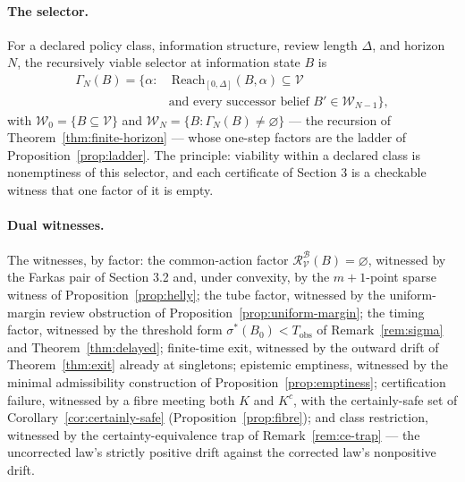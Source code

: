 \documentclass[10pt,twocolumn]{article}
\theoremstyle{definition}
\begin{document}
\paragraph{The selector.} For a declared policy class, information structure, review length \(\Delta\), and horizon \(N\), the recursively viable selector at information state \(B\) is
\[
\begin{split}
\Gamma_{N}(B) = \bigl\{\alpha :&\ \mathrm{Reach}_{[0,\Delta]}(B,\alpha) \subseteq \mathcal{V} \\
&\text{and every successor belief } B' \in \mathcal{W}_{N-1}\bigr\},
\end{split}
\]
with \(\mathcal{W}_{0} = \{B \subseteq \mathcal{V}\}\) and \(\mathcal{W}_{N} = \{B : \Gamma_{N}(B) \neq \varnothing\}\) --- the recursion of Theorem~\ref{thm:finite-horizon} --- whose one-step factors are the ladder of Proposition~\ref{prop:ladder}. The principle: viability within a declared class is nonemptiness of this selector, and each certificate of Section 3 is a checkable witness that one factor of it is empty.

\paragraph{Dual witnesses.} The witnesses, by factor: the common-action factor \(\mathcal{R}^{\mathcal{B}}_{\mathcal{V}}(B) = \varnothing\), witnessed by the Farkas pair of Section 3.2 and, under convexity, by the \(m+1\)-point sparse witness of Proposition~\ref{prop:helly}; the tube factor, witnessed by the uniform-margin review obstruction of Proposition~\ref{prop:uniform-margin}; the timing factor, witnessed by the threshold form \(\sigma^{*}(B_{0}) < T_{\mathrm{obs}}\) of Remark~\ref{rem:sigma} and Theorem~\ref{thm:delayed}; finite-time exit, witnessed by the outward drift of Theorem~\ref{thm:exit} already at singletons; epistemic emptiness, witnessed by the minimal admissibility construction of Proposition~\ref{prop:emptiness}; certification failure, witnessed by a fibre meeting both \(K\) and \(K^{c}\), with the certainly-safe set of Corollary~\ref{cor:certainly-safe} (Proposition~\ref{prop:fibre}); and class restriction, witnessed by the certainty-equivalence trap of Remark~\ref{rem:ce-trap} --- the uncorrected law's strictly positive drift against the corrected law's nonpositive drift.
\end{document}
